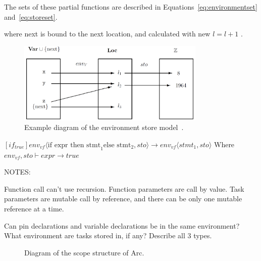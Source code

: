 The sets of these partial functions are described in Equations~\ref{eq:environmentset} and~\ref{eq:storeset}.


where next is bound to the next location, and calculated with new $l = l + 1$ .




\begin{figure}[htbp]
  \centering
  \includegraphics[width=0.8\textwidth]{figures/Environment_Store.png}
  \caption{Example diagram of the environment store model~\cite{Huttel2010}.}
  \label{fig:envstomodel}
\end{figure}


$[if_{true}]
  env_{vf}\langle \text{if expr then stmt}_1 \text{else stmt}_2,sto \rangle \rightarrow env_{vf} \langle stmt_1,sto\rangle$
Where  $env_{vf},sto \vdash expr \to true$



NOTES:

Function call can't use recursion.
Function parameters are call by value.
Task parameters are mutable call by reference, and there can be only one mutable reference at a time.

Can pin declarations and variable declarations be in the same environment?
What environment are tasks stored in, if any? Describe all 3 types.











\begin{figure}[htbp]
  \centering
  \caption{Diagram of the scope structure of Arc.}
  \label{fig:arcscoperules}
\end{figure}


